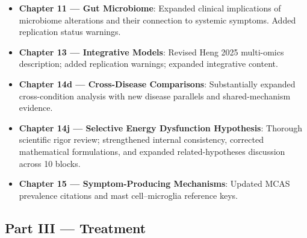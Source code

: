 \begin{itemize}
  \item \textbf{Chapter 11 --- Gut Microbiome}: Expanded clinical implications of
    microbiome alterations and their connection to systemic symptoms. Added
    replication status warnings.

  \item \textbf{Chapter 13 --- Integrative Models}: Revised Heng 2025 multi-omics
    description; added replication warnings; expanded integrative content.

  \item \textbf{Chapter 14d --- Cross-Disease Comparisons}: Substantially
    expanded cross-condition analysis with new disease parallels and
    shared-mechanism evidence.

  \item \textbf{Chapter 14j --- Selective Energy Dysfunction Hypothesis}: Thorough
    scientific rigor review; strengthened internal consistency, corrected
    mathematical formulations, and expanded related-hypotheses discussion
    across 10 blocks.

  \item \textbf{Chapter 15 --- Symptom-Producing Mechanisms}: Updated MCAS
    prevalence citations and mast cell--microglia reference keys.

\end{itemize}

\subsection*{Part III --- Treatment}


